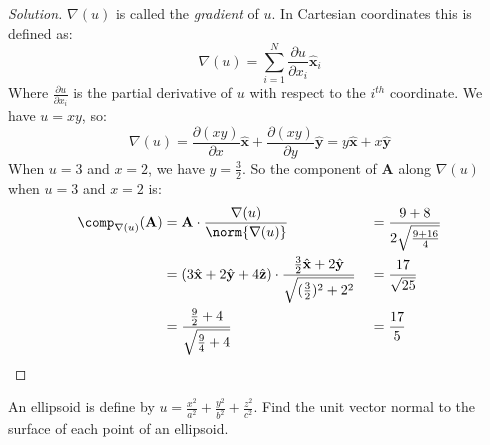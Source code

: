 \documentclass[crop=false,class=book,oneside]{standalone}
\begin{document}
            \begin{proof}[Solution]
                $\nabla(u)$ is called the \textit{gradient} of $u$.
                In Cartesian coordinates this is defined as:
                \begin{equation*}
                    \nabla(u)=\sum_{i=1}^{N}\frac{\partial u}
                        {\partial x_{i}}\hat{\mathbf{x}}_{i}
                \end{equation*}
                Where $\frac{\partial u}{\partial x_{i}}$
                is the partial derivative
                of $u$ with respect to the $i^{th}$ coordinate.
                We have $u=xy$, so:
                \begin{equation*}
                    \nabla(u)
                    =\frac{\partial(xy)}{\partial x}\hat{\mathbf{x}}
                    +\frac{\partial(xy)}{\partial y}\hat{\mathbf{y}}
                    =y\hat{\mathbf{x}}+x\hat{\mathbf{y}}
                \end{equation*}
                When $u=3$ and $x=2$, we have $y=\frac{3}{2}$.
                So the component of $\mathbf{A}$ along $\nabla(u)$
                when $u=3$ and $x=2$ is:
                \begin{align*}
                    \comp_{\nabla(u)}(\mathbf{A})
                    &=
                    \mathbf{A}\cdot\frac{\nabla(u)}{\norm{\nabla(u)}}
                    &
                    &=\frac{9+8}{2\sqrt{\frac{9+16}{4}}}\\
                    &=
                    (3\hat{\mathbf{x}}
                    +2\hat{\mathbf{y}}
                    +4\hat{\mathbf{z}})
                    \cdot
                    \frac{%
                        \frac{3}{2}\hat{\mathbf{x}}%
                        +2\hat{\mathbf{y}}%
                    }{%
                        \sqrt{(\frac{3}{2})^{2}+2^{2}}%
                    }
                    &
                    &=\frac{17}{\sqrt{25}}\\
                    &=\frac{\frac{9}{2}+4}{\sqrt{\frac{9}{4}+4}}
                    &
                    &=\frac{17}{5}\\
                \end{align*}
            \end{proof}
            \begin{problem}[Wangsness 1-9]
                An ellipsoid is define by
                $u%
                 =\frac{x^{2}}{a^{2}}%
                 +\frac{y^{2}}{b^{2}}%
                 +\frac{z^{2}}{c^{2}}$.
                Find the unit vector normal to the
                surface of each point of an
                ellipsoid.
            \end{problem}
\end{document}

